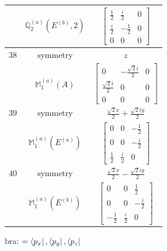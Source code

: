 \documentclass[fleqn,8pt,landscape]{jsarticle}
\begin{document}
\begin{longtable}{ccc}
$  $ & $ \mathbb{Q}_{2}^{(a)}(E^{(b)},2) $ & $ \begin{bmatrix} \frac{1}{2} & \frac{i}{2} & 0 \\ \frac{i}{2} & - \frac{1}{2} & 0 \\ 0 & 0 & 0 \end{bmatrix} $ \\ \hline
$ 38 $ & $ \text{symmetry} $ & $ z $ \\
$  $ & $ \mathbb{M}_{1}^{(a)}(A) $ & $ \begin{bmatrix} 0 & - \frac{\sqrt{2} i}{2} & 0 \\ \frac{\sqrt{2} i}{2} & 0 & 0 \\ 0 & 0 & 0 \end{bmatrix} $ \\ \hline
$ 39 $ & $ \text{symmetry} $ & $ \frac{\sqrt{2} x}{2} + \frac{\sqrt{2} i y}{2} $ \\
$  $ & $ \mathbb{M}_{1}^{(a)}(E^{(a)}) $ & $ \begin{bmatrix} 0 & 0 & - \frac{1}{2} \\ 0 & 0 & - \frac{i}{2} \\ \frac{1}{2} & \frac{i}{2} & 0 \end{bmatrix} $ \\ \hline
$ 40 $ & $ \text{symmetry} $ & $ \frac{\sqrt{2} x}{2} - \frac{\sqrt{2} i y}{2} $ \\
$  $ & $ \mathbb{M}_{1}^{(a)}(E^{(b)}) $ & $ \begin{bmatrix} 0 & 0 & \frac{1}{2} \\ 0 & 0 & - \frac{i}{2} \\ - \frac{1}{2} & \frac{i}{2} & 0 \end{bmatrix} $ \\ \hline
\end{longtable}
bra: $=\bra{p_{x}}, \bra{p_{y}}, \bra{p_{z}}$
\end{document}
